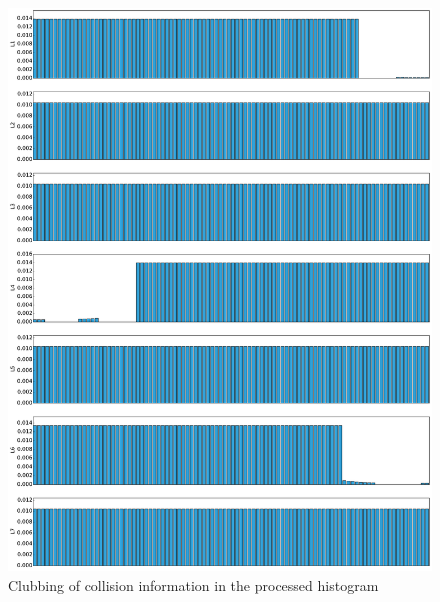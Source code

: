 \begin{figure}
\centering
\includegraphics[width=\textwidth]{./images/hist_coll3}
\caption[Clubbing of collision information in the processed histogram]{Clubbing of collision information in the processed histogram}
\label{hist_coll3}
\end{figure}

